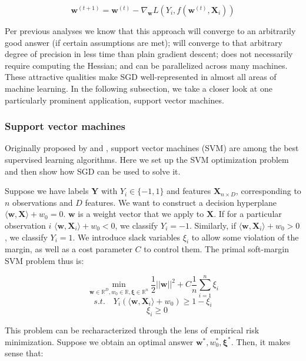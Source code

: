 \documentclass{article}
\begin{document}
\begin{equation}
	\bm{w}^{(t+1)} = \bm{w}^{(t)} - \nabla_{\bm{w}} L(Y_i, f(\bm{w}^{(t)}, \bm{X}_i))
\end{equation}

Per previous analyses we know that this approach will converge to an arbitrarily
good answer (if certain assumptions are met); will converge to that arbitrary
degree of precision in less time than plain gradient descent; does not
necessarily require computing the Hessian; and can be parallelized across many
machines. These attractive qualities make SGD well-represented in almost all areas of
machine learning. In the following subsection, we take a closer look at one
particularly prominent application, support vector machines.

\subsubsection{Support vector machines}

Originally proposed by \cite{boser1992training} and \cite{cortes1995support}, support vector machines (SVM)
are among the best supervised learning algorithms. Here we set up the SVM
optimization
problem and then show how SGD can be used to solve it.

Suppose we have labels $\bm{Y}$ with $Y_i \in \{-1,1\}$ and features $\bm{X}_{n
\times D}$, corresponding to $n$ observations and $D$ features.
We want to construct a decision hyperplane 
$\langle \bm{w}, \bm{X} \rangle + w_0= 0$. $\bm{w}$ is
a weight vector that we apply to $\bm{X}$. If for a particular observation $i$
$\langle \bm{w}, \bm{X}_i \rangle + w_0 < 0$, we
classify $Y_i=-1$. Similarly, if $\langle \bm{w}, \bm{X}_i \rangle + w_0 > 0$, we
classify $Y_i = 1$. We introduce slack variables $\xi_i$ to allow some
violation of the margin, as well as a cost parameter $C$ to control them. The
primal soft-margin SVM problem thus is:

\begin{equation}
	\min_{\bm{w} \in \mathbb{R}^D, w_0 \in \mathbb{R}, \bm{\xi} \in \mathbb{R}^n} 
	\frac{1}{2} ||\bm{w}||^2 + C \frac{1}{n} \sum_{i=1}^n \xi_i
\end{equation}
$$
s.t. \quad Y_i(\langle \bm{w}, \bm{X}_i \rangle + w_0) \geq 1 - \xi_i 
$$
$$
\quad \xi_i \geq 0 
$$

This problem can be recharacterized through the lens of empirical risk
minimization. Suppose we obtain an optimal answer $\bm{w}^*, w_0^*, \bm{\xi}^*$. 
Then, it makes sense that:
\end{document}
